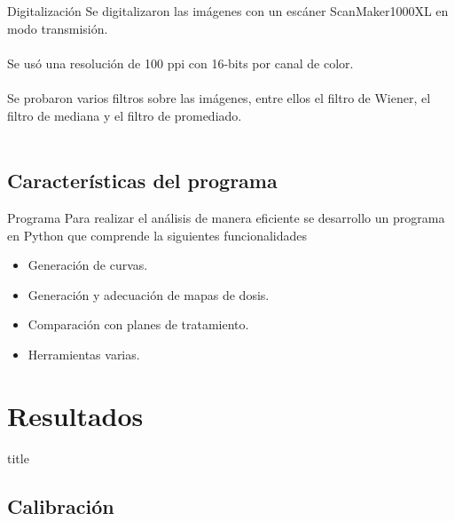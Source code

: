 \documentclass[12pt]{beamer}
\begin{document}
\begin{frame}{Digitalización}
Se digitalizaron las imágenes con un escáner  ScanMaker1000XL en modo transmisión.\\~\\

Se usó una resolución de 100 ppi con 16-bits por canal de color.\\~\\

Se probaron varios filtros sobre las imágenes, entre ellos el filtro de Wiener, el filtro de mediana y el filtro de promediado\cite{Benesty2008}.\\~\\
\end{frame}

\subsection{Características del programa}

\begin{frame}{Programa}
Para realizar el análisis de manera eficiente se desarrollo un programa en Python que comprende la siguientes funcionalidades
\begin{itemize}
	\item Generación de curvas.
	\item Generación y adecuación de mapas de dosis.
	\item Comparación con planes de tratamiento.
	\item Herramientas varias.
\end{itemize}
\end{frame}

\section{Resultados}
\begin{frame}
\vfill
\centering
\begin{beamercolorbox}[sep=8pt,center,shadow=true,rounded=true]{title}
	\insertsectionhead\par%
\end{beamercolorbox}
\vfill
\end{frame}

\subsection{Calibración}
\end{document}
